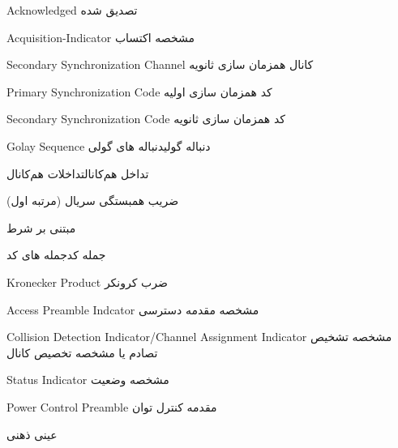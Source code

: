 {Acknowledged}
	{تصدیق شده}{}


{Acquisition-Indicator}
	{مشخصه اکتساب}{}

{Secondary Synchronization Channel} 
{کانال همزمان سازی ثانویه}{}


{Primary Synchronization Code} 
{کد همزمان سازی اولیه}{}

{Secondary Synchronization Code} 
{کد همزمان سازی ثانویه}{}


{Golay Sequence} 
{دنباله گولی}{دنباله های گولی}


{تداخل هم‌کانال}{تداخلات هم‌کانال}

{ضریب همبستگی سریال (مرتبه اول)}{}

{مبتنی بر شرط}{}

{جمله کد}{جمله های کد}

{Kronecker Product}
{ضرب کرونکر}{}

{Access Preamble Indcator}
{مشخصه مقدمه دسترسی }{}


{Collision Detection Indicator/Channel Assignment Indicator} 
{مشخصه تشخیص تصادم یا مشخصه تخصیص کانال}{}


{Status Indicator}
{مشخصه وضعیت}{}

{Power Control Preamble} 
{مقدمه کنترل توان}{}

{عینی}{}
{ذهنی}{}


